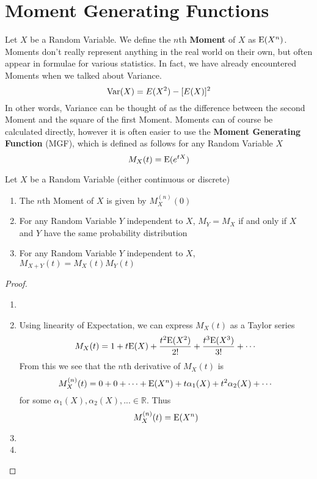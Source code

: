 
\section{Moment Generating Functions}
Let $X$ be a Random Variable. We define the $n$th \textbf{Moment} of $X$ as $\textup{E}(X^n)$. Moments don't really represent anything in the real world on their own, but often appear in formulae for various statistics. In fact, we have already encountered Moments when we talked about Variance.
\[
    \textup{Var}(X)=E(X^2)-[E(X)]^2
\]
In other words, Variance can be thought of as the difference between the second Moment and the square of the first Moment. Moments can of course be calculated directly, however it is often easier to use the \textbf{Moment Generating Function} (MGF), which is defined as follows for any Random Variable $X$
\[
    M_X(t)=\textup{E}(e^{tX})
\]
\begin{theorem}
    Let $X$ be a Random Variable (either continuous or discrete)
    \begin{enumerate}
        \item The $n$th Moment of $X$ is given by $M_X^{(n)}(0)$
        \item For any Random Variable $Y$ independent to $X$, $M_Y=M_X$ if and only if $X$ and $Y$ have the same probability distribution
        \item For any Random Variable $Y$ independent to $X$, $M_{X+Y}(t)=M_X(t)M_Y(t)$
    \end{enumerate}
    \begin{proof}
        \begin{enumerate}
            \item[]
            \item Using linearity of Expectation, we can express $M_X(t)$ as a Taylor series
            \[
                M_X(t)=1+t\textup{E}(X)+\frac{t^2\textup{E}(X^2)}{2!} + \frac{t^3\textup{E}(X^3)}{3!} + \cdots 
            \]
            From this we see that the $n$th derivative of $M_X(t)$ is
            \[
                M_X^{(n)}(t)=0+0+\cdots+\textup{E}(X^n)+ t\alpha_1(X) + t^2 \alpha_2(X) + \cdots
            \]
            for some $\alpha_1(X), \alpha_2(X),...\in\mathbb R$. Thus
            \[
                M_X^{(n)}(t)=\textup{E}(X^n)
            \]
            \item\todo
            \item\todo
        \end{enumerate}
    \end{proof}
\end{theorem}
\label{thm:mgfprops}

